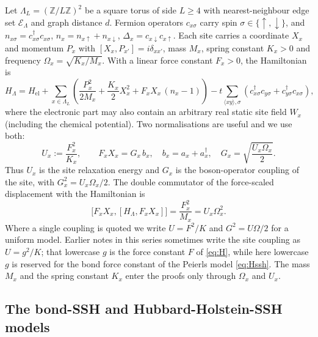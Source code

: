 \documentclass[11pt]{article}
\theoremstyle{definition}
\theoremstyle{remark}
\begin{document}
Let $\Lambda_L=(\mathbb{Z}/L\mathbb{Z})^2$ be a square torus of side $L\ge4$ with
nearest-neighbour edge set $\mathcal{E}_\Lambda$ and graph distance $d$. Fermion
operators $c_{x\sigma}$ carry spin $\sigma\in\{\uparrow,\downarrow\}$, and
$n_{x\sigma}=c_{x\sigma}^\dagger c_{x\sigma}$, $n_x=n_{x\uparrow}+n_{x\downarrow}$,
$\Delta_x=c_{x\downarrow}c_{x\uparrow}$. Each site carries a coordinate $X_x$ and
momentum $P_x$ with $[X_x,P_{x'}]=i\delta_{xx'}$, mass $M_x$, spring constant
$K_x>0$ and frequency $\Omega_x=\sqrt{K_x/M_x}$. With a linear force constant
$F_x>0$, the Hamiltonian is
\begin{equation}
H_\Lambda=H_{\mathrm{el}}+\sum_{x\in\Lambda_L}\left(\frac{P_x^2}{2M_x}
+\frac{K_x}{2}X_x^2+F_xX_x\,(n_x-1)\right)-t\sum_{\langle xy\rangle,\sigma}
\left(c_{x\sigma}^\dagger c_{y\sigma}+c_{y\sigma}^\dagger c_{x\sigma}\right),
\label{eq:H}
\end{equation}
where the electronic part may also contain an arbitrary real static site field
$W_x$ (including the chemical potential). Two normalisations are useful and we use
both:
\begin{equation}
U_x:=\frac{F_x^2}{K_x},\qquad
F_xX_x=G_x\,b_x,\quad b_x=a_x+a_x^\dagger,\quad G_x=\sqrt{\frac{U_x\Omega_x}{2}}.
\label{eq:U}
\end{equation}
Thus $U_x$ is the site relaxation energy and $G_x$ is the boson-operator coupling of
the site, with $G_x^2=U_x\Omega_x/2$. The double commutator of the force-scaled
displacement with the Hamiltonian is
\begin{equation}
\bigl[F_xX_x,[H_\Lambda,F_xX_x]\bigr]=\frac{F_x^2}{M_x}=U_x\Omega_x^2 .
\label{eq:dcomm}
\end{equation}
Where a single coupling is quoted we write $U=F^2/K$ and $G^2=U\Omega/2$ for a
uniform model. Earlier notes
in this series sometimes write the site coupling as $U=g^2/K$; that lowercase $g$ is
the force constant $F$ of \eqref{eq:H}, while here lowercase $g$ is reserved for the
bond force constant of the Peierls model \eqref{eq:Hssh}. The mass $M_x$ and the
spring constant $K_x$ enter the proofs only through $\Omega_x$ and $U_x$.

\subsection{The bond-SSH and Hubbard-Holstein-SSH models}
\end{document}
